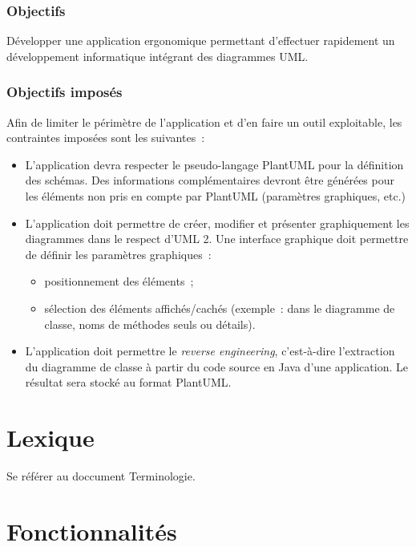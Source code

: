 \documentclass[hidelinks, 10pt,a4paper]{article}
\begin{document}
\subsubsection*{Objectifs}
Développer une application ergonomique permettant d’effectuer rapidement un développement informatique intégrant des diagrammes UML.
\subsubsection*{Objectifs imposés}
Afin de limiter le périmètre de l’application et d’en faire un outil exploitable, les contraintes imposées sont les suivantes~:
\begin{itemize}
\item L’application devra respecter le pseudo-langage PlantUML pour la définition des schémas. Des informations complémentaires devront être générées pour les éléments non pris en compte par PlantUML (paramètres graphiques, etc.)
\item L’application doit permettre de créer, modifier et présenter graphiquement les diagrammes dans le respect d’UML 2.
Une interface graphique doit permettre de définir les paramètres graphiques~:
\begin{itemize}
\item positionnement des éléments~;
\item sélection des éléments affichés/cachés (exemple~: dans le diagramme de classe, noms de méthodes seuls ou détails).
\end{itemize}
\item L’application doit permettre le \textit{reverse engineering}, c’est-à-dire l’extraction du diagramme de classe à partir du code source en Java d’une application. Le résultat sera stocké au format PlantUML.
\end{itemize}

\section{Lexique}
Se référer au doccument Terminologie.

\section{Fonctionnalités}
\end{document}
